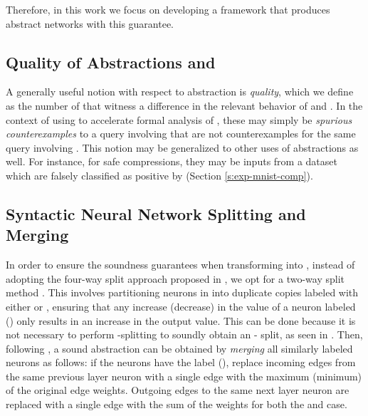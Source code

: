 Therefore, in this work we focus on developing a framework that produces
abstract networks with this guarantee.

\subsection{Quality of Abstractions and \gencex}
\label{s:qual}

A generally useful notion with respect to abstraction is \textit{quality},
which we define as the number of \textit{\gencex} that witness a difference in
the relevant behavior of \abs and \cnc. In the context of using \abs to
accelerate formal analysis of \dnn, these \gencex may simply be
\textit{spurious counterexamples} \cite{cegar-nn, cleverest-nn} to a query
involving \abs that are not counterexamples for the same query involving \cnc.
This notion may be generalized to other uses of abstractions as well. For
instance, for safe compressions, they may be inputs from a dataset which
are falsely classified as positive by \abs (Section \ref{s:exp-mnist-comp}).

\subsection{Syntactic Neural Network Splitting and Merging}
\label{s:nn-sam}

In order to ensure the soundness guarantees when transforming \cnc into \abs, 
instead of adopting the four-way split approach proposed in \cite{cegar-nn},
we opt for a two-way split method \cite{chauhan2022efficiently,liu2022abstraction,
10.1145/3644387}. This involves partitioning neurons in \cnc into duplicate
copies labeled with either {\inc or \dec}, ensuring that any increase 
(decrease) in the value of a neuron labeled \inc (\dec) only results in 
an increase in the output value. This can be done because it is not
necessary to perform \posc-\negc splitting to soundly obtain an \inc-\dec
split, as seen in \cite{chauhan2022efficiently,liu2022abstraction,
10.1145/3644387}. Then, following \cite{cegar-nn}, a sound 
abstraction can be obtained by \textit{merging} all similarly 
labeled neurons as follows: if the neurons have
the label \inc (\dec), replace incoming edges from the same
previous layer neuron with a single edge with the maximum (minimum) of the
original edge weights. Outgoing edges to the same next layer neuron are replaced
with a single edge with the sum of the weights for both the \inc and \dec case.


